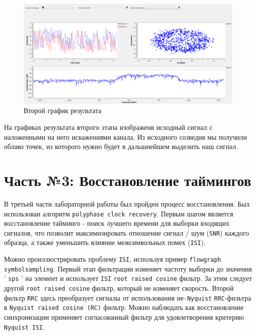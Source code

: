 \documentclass[a4paper]{article}
\begin{document}
           \begin{figure}[H]
                \centering
                \includegraphics[width=\textwidth]{img/p2_3.png}
                \caption{Второй график результата}
                \label{fig:p2_3}
            \end{figure}
            
            На графиках результата второго этапа изображенв исходный сигнал с наложенными на него искажениями канала. Из исходного созведия мы получили облако точек, из которого нужно будет в дальшнейшем выделить наш сигнал.
           
    \newpage
        \section{Часть №3: Восстановление таймингов}
        
           В третьей части лабораторной работы был пройден процесс восстановления. Был использован алгоритм \texttt{polyphase clock recovery}. 
           Первым шагом является восстановление тайминго - поиск лучшего времени для выборки входящих сигналов, что позволит максимизировать отношение сигнал / шум (\texttt{SNR}) каждого образца, а также уменьшить влияние межсимвольных помех (\texttt{ISI}).
           
           Можно проиллюстрировать проблему \texttt{ISI}, используя пример \texttt{flowgraph \\symbolsampling}. Первый этап фильтрации изменяет частоту выборки до значения ’ \texttt{sps} ’ на элемент и использует \texttt{ISI} \texttt{root raised cosine} фильтр. За этим следует другой \texttt{root raised cosine} фильтр, который не изменяет скорость. Второй фильтр \texttt{RRC} здесь преобразует сигналы от использования не\texttt{-Nyquist} \texttt{RRC}-фильтра в \texttt{Nyquist raised cosine (RC)} фильтр. Можно наблюдать как восстановление синхронизации применяет согласованный фильтр для удовлетворения критерию \texttt{Nyquist ISI}.
            
\end{document}

